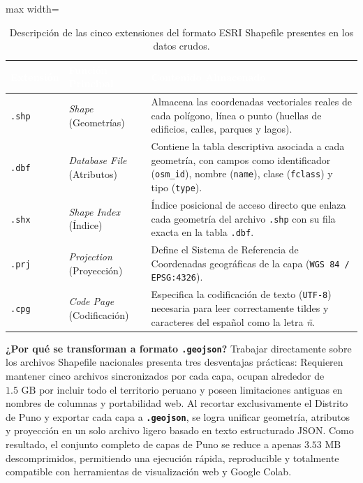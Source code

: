 \documentclass[11pt,a4paper]{article}
\begin{document}
\begin{table}[H]
    \centering
    \caption{Descripción de las cinco extensiones del formato ESRI Shapefile presentes en los datos crudos.}
    \label{tab:shapefile}
    \small
    \begin{adjustbox}{max width=\textwidth}
    \begin{tabular}{llp{9.2cm}}
        \toprule
        \rowcolor{verdeHeader}
        \textcolor{white}{\textbf{Extensión}} & \textcolor{white}{\textbf{Función Principal}} & \textcolor{white}{\textbf{Contenido Almacenado}} \\
        \midrule
        \texttt{.shp} & \textit{Shape} (Geometrías) & Almacena las coordenadas vectoriales reales de cada polígono, línea o punto (huellas de edificios, calles, parques y lagos). \\
        \rowcolor{verdeSuave!50}
        \texttt{.dbf} & \textit{Database File} (Atributos) & Contiene la tabla descriptiva asociada a cada geometría, con campos como identificador (\texttt{osm\_id}), nombre (\texttt{name}), clase (\texttt{fclass}) y tipo (\texttt{type}). \\
        \texttt{.shx} & \textit{Shape Index} (Índice) & Índice posicional de acceso directo que enlaza cada geometría del archivo \texttt{.shp} con su fila exacta en la tabla \texttt{.dbf}. \\
        \rowcolor{verdeSuave!50}
        \texttt{.prj} & \textit{Projection} (Proyección) & Define el Sistema de Referencia de Coordenadas geográficas de la capa (\texttt{WGS 84 / EPSG:4326}). \\
        \texttt{.cpg} & \textit{Code Page} (Codificación) & Especifica la codificación de texto (\texttt{UTF-8}) necesaria para leer correctamente tildes y caracteres del español como la letra \textit{ñ}. \\
        \bottomrule
    \end{tabular}
    \end{adjustbox}
\end{table}

\textbf{¿Por qué se transforman a formato \texttt{.geojson}?} Trabajar directamente sobre los archivos Shapefile nacionales presenta tres desventajas prácticas: Requieren mantener cinco archivos sincronizados por cada capa, ocupan alrededor de $1.5\text{ GB}$ por incluir todo el territorio peruano y poseen limitaciones antiguas en nombres de columnas y portabilidad web. Al recortar exclusivamente el Distrito de Puno y exportar cada capa a \textbf{\texttt{.geojson}}, se logra unificar geometría, atributos y proyección en un solo archivo ligero basado en texto estructurado JSON. Como resultado, el conjunto completo de capas de Puno se reduce a apenas $3.53\text{ MB}$ descomprimidos, permitiendo una ejecución rápida, reproducible y totalmente compatible con herramientas de visualización web y Google Colab.
\end{document}
